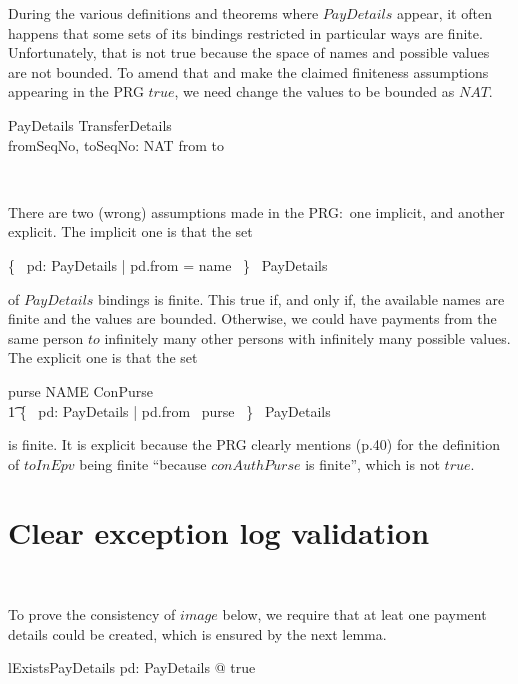 During the various definitions and theorems where $PayDetails$
appear, it often happens that some sets of its bindings restricted
in particular ways are finite. Unfortunately, that is not true
because the space of names and possible values are not bounded.
To amend that and make the claimed finiteness assumptions appearing
in the PRG $true$, we need change the values to be bounded as $NAT$.
%
\begin{LSDef}
\begin{schema}{PayDetails}
    TransferDetails \\
    fromSeqNo, toSeqNo: NAT
\where
    from \neq to
\end{schema}~\end{LSDef}
%
There are two (wrong) assumptions made in the PRG:~one implicit,
and another explicit. The implicit one is that the set
%
\begin{gzed}
   \{~ pd: PayDetails | pd.from = name ~\} \in \finset~PayDetails
\end{gzed}
%
of $PayDetails$ bindings is finite. This true if, and only if, the available names
are finite and the values are bounded. Otherwise, we could have
payments from the same person $to$ infinitely many other persons with
infinitely many possible values. The explicit one is that the set
%
\begin{gzed}
   purse \in NAME \ffun ConPurse \implies \\ \t1
   \{~ pd: PayDetails | pd.from \in \dom~purse ~\} \in \finset~PayDetails
\end{gzed}
%
is finite. It is explicit because the PRG clearly mentions (p.40) for
the definition of $toInEpv$ being finite ``because $conAuthPurse$ is finite'',
which is not $true$.

\section{Clear exception log validation}

\begin{LGSet}
\begin{zed}
   [CLEAR]
\end{zed}~\end{LGSet}

To prove the consistency of $image$ below, we require that at
leat one payment details could be created, which is ensured by
the next lemma.
%
\begin{LNewLemma}
\begin{theorem}{lExistsPayDetails}
    \exists pd: PayDetails @ true
\end{theorem}~\end{LNewLemma}

